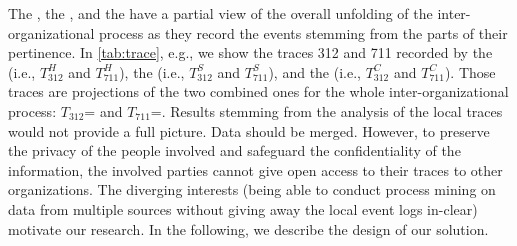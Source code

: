 The , the , and the  have a partial view of  the overall unfolding of the inter-organizational process as they record the events stemming from the parts of their pertinence. %
In \cref{tab:trace}, e.g., we show the traces 312 and 711 recorded by the  (i.e., $T^H_{312}$ and $T^H_{711}$), the  (i.e., $T^S_{312}$ and $T^S_{711}$), and the  (i.e., $T^C_{312}$ and $T^C_{711}$).
Those traces are projections of the two combined ones for the whole inter-organizational process: $T_{312}$={\textlangle} and $T_{711}$={\textlangle}. %
Results stemming from the analysis of the local traces would not provide a full picture. Data should be merged. However, to preserve the privacy of the people involved and safeguard the confidentiality of the information, the involved parties cannot give open access to their traces to other organizations. The diverging interests (being able to conduct process mining on data from multiple sources without giving away the local event logs in-clear) motivate our research. In the following, we describe the design of our solution.